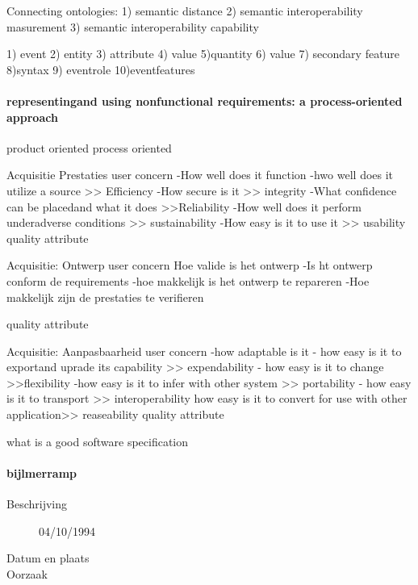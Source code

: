 Connecting ontologies:
1) semantic distance
2) semantic interoperability masurement
3) semantic interoperability capability

1) event
2) entity
3) attribute
4) value
5)quantity
6) value
7) secondary feature
8)syntax
9) eventrole
10)eventfeatures




\paragraph{representingand using nonfunctional requirements: a process-oriented approach}
product oriented
process oriented


Acquisitie Prestaties
user concern
-How well does it function
-hwo well does it utilize a source >> Efficiency
-How secure is it >> integrity
-What confidence can be placedand what it does >>Reliability
-How well does it perform underadverse conditions >> sustainability
-How easy is it to use it >> usability
quality attribute


Acquisitie: Ontwerp
user concern
Hoe valide is het ontwerp
-Is ht ontwerp conform de requirements
-hoe makkelijk is het ontwerp te repareren
-Hoe makkelijk zijn de prestaties te verifieren

quality attribute


Acquisitie: Aanpasbaarheid
user concern
-how adaptable is it
- how easy is it to exportand uprade its capability >> expendability
- how easy is it to change >>flexibility
-how easy is it to infer with other system >> portability
- how easy is it to transport >> interoperability
how easy is it to convert for use with other application>> reaseability
quality attribute


what is a good software specification

\cite{fvaandrager2322010Goodmodel}
\cite{onix01102022devopmodel}
\cite{sulemani04012021softwareprocesmodel}
\cite{globalluxsoft18102017softdev}
\cite{wiegers30052022SRS}
\cite{muller06092020goodspecification}
\cite{informit30062008reqmanagement}
\cite{altexsoft15092020writingSRS}





\paragraph{bijlmerramp}

\begin{description}
	\item[Beschrijving] 04/10/1994
	\item[Datum en plaats] 
	\item[Oorzaak]
\end{description}


